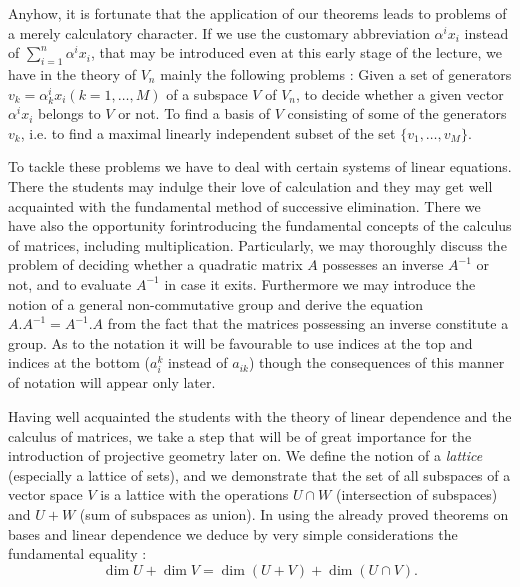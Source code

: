Anyhow, it is fortunate that the application of our theorems leads to
problems of a merely calculatory character. If we use the customary
abbreviation $\alpha^i x_i$ instead of $\sum\limits^n_{i=1} \alpha^i
x_i$, that may be introduced even at this early stage of the lecture,
we have in the theory of $V_n$ mainly the following problems : Given a
set of generators $v_k = \alpha^i_k x_i (k = 1, \ldots, M)$ of a
subspace $V$ of $V_n$, to decide whether a given vector $\alpha^i x_i$
belongs to $V$ or not. To find a basis of $V$ consisting of some of
the generators $v_k$, i.e. to find a maximal linearly independent
subset of the set $\{v_1, \ldots, v_M \}$.

To tackle these problems we have to deal with certain systems of
linear equations. There the students may indulge their love of
calculation and they may get well acquainted with the fundamental
method of successive elimination. There we have also the opportunity
for\pageoriginale introducing the fundamental concepts of the calculus
of matrices, including multiplication. Particularly, we may thoroughly
discuss the problem of deciding whether a quadratic matrix $A$
possesses an inverse $A^{-1}$ or not, and to evaluate $A^{-1}$ in case
it exits. Furthermore we may introduce the notion of a general
non-commutative group and derive the equation $A.A^{-1} = A^{-1}. A$
from the fact that the matrices possessing an inverse constitute a
group. As to the notation it will be favourable to use indices at the
top and indices at the bottom ($a^k_i$ instead of $a_{ik}$) though the
consequences of this manner of notation will appear only later. 

Having well acquainted the students with the theory of linear
dependence and the calculus of matrices, we take a step that will be
of great importance for the introduction of projective geometry later
on. We define the notion of a \textit{lattice} (especially a lattice
of sets), and we demonstrate that the set of all subspaces of a vector
space $V$ is a lattice with the operations $U \cap W$ (intersection of
subspaces) and $U +W$ (sum of subspaces as union). In using the
already proved theorems on bases and linear dependence we deduce by
very simple considerations the fundamental equality :
\begin{equation*}
\dim  U + \dim V = \dim (U+V) + \dim (U \cap V). \tag{$\ast$}
\end{equation*}

